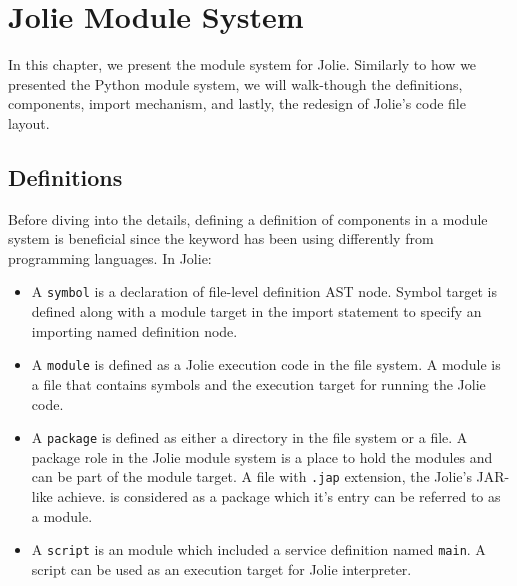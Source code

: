 \chapter{Jolie Module System}

In this chapter, we present the module system for Jolie.
Similarly to how we presented the Python module system, we will walk-though the definitions, components, import mechanism, and lastly, the redesign of Jolie's code file layout.

\section{Definitions}

Before diving into the details, defining a definition of components in a module system is beneficial since the keyword has been using differently from programming languages. In Jolie:

\begin{itemize}
      \item
            A \texttt{symbol} is a declaration of file-level definition AST node. Symbol target is defined along with a module target in the import statement to specify an importing named definition node.
      \item
            A \texttt{module} is defined as a Jolie execution code in the file system. A module is a file that contains symbols and the execution target for running the Jolie code.
      \item
            A \texttt{package} is defined as either a directory in the file system or a file. A package role in the Jolie module system is a place to hold the modules and can be part of the module target. A file with \texttt{.jap} extension, the Jolie's JAR-like achieve. is considered as a package which it's entry can be referred to as a module.
      \item
            A \texttt{script} is an module which included a service definition named \texttt{main}. A script can be used as an execution target for Jolie interpreter. 
\end{itemize}











